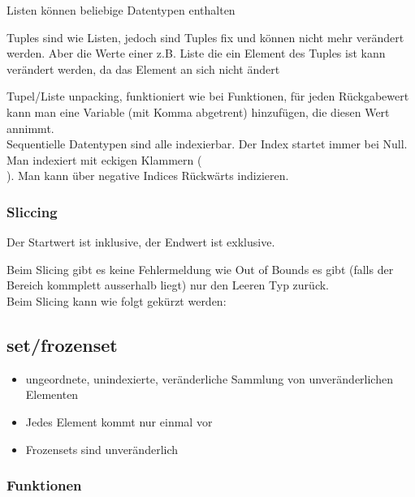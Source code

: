	
	Listen können beliebige Datentypen enthalten
	
	Tuples sind wie Listen, jedoch sind Tuples fix und können nicht mehr verändert werden. Aber die Werte
	einer z.B. Liste die ein Element des Tuples ist kann verändert werden, da das Element an sich
	nicht ändert
	
	Tupel/Liste unpacking, funktioniert wie bei Funktionen, für jeden Rückgabewert kann man eine Variable
	(mit Komma abgetrent) hinzufügen, die diesen Wert annimmt.\\
	Sequentielle Datentypen sind alle indexierbar. 
	Der Index startet immer bei Null. Man indexiert mit eckigen Klammern (\[\]). Man kann über negative Indices Rückwärts indizieren.
	\subsubsection{Sliccing}
	Der Startwert ist inklusive, der Endwert ist exklusive.
	
	
	Beim Slicing gibt es keine Fehlermeldung wie Out of Bounds es gibt (falls der Bereich kommplett ausserhalb liegt)
	nur den Leeren Typ zurück.\\
	Beim Slicing kann wie folgt gekürzt werden:
	
	
\subsection{set/frozenset}
\begin{itemize}
\item ungeordnete, unindexierte, veränderliche Sammlung von unveränderlichen Elementen
\item Jedes Element kommt nur einmal vor
\item Frozensets sind unveränderlich 
\end{itemize}


\subsubsection{ Funktionen}



